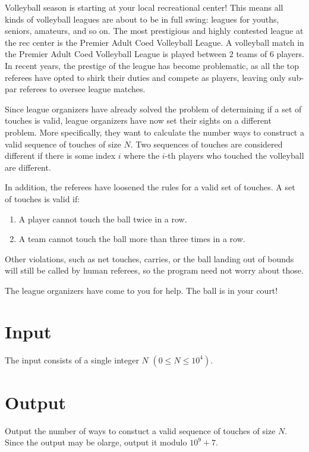 
Volleyball season is starting at your local recreational center! This means all kinds of volleyball
leagues are about to be in full swing: leagues for youths, seniors, amateurs, and so on. The most
prestigious and highly contested league at the rec center is the Premier Adult Coed Volleyball
League. A volleyball match in the Premier Adult Coed Volleyball League is played between $2$ teams of
$6$ players. In recent years, the prestige of the league has become problematic, as all the top referees
have opted to shirk their duties and compete as players, leaving only sub-par referees to oversee
league matches.

Since league organizers have already solved the problem of determining if a set of touches is valid, 
league organizers have now set their sights on a different problem. More specifically, they want to 
calculate the number ways to construct a valid sequence of touches of size $N$. Two sequences of touches 
are considered different if there is some index $i$ where the $i$-th players who touched the 
volleyball are different.

In addition, the referees have loosened the rules for a valid set of touches.
A set of touches is valid if:

\begin{enumerate}
    \item A player cannot touch the ball twice in a row.
    \item A team cannot touch the ball more than three times in a row.
\end{enumerate}

Other violations, such as net touches, carries, or the ball landing out of bounds will still be called
by human referees, so the program need not worry about those.

The league organizers have come to you for help. The ball is in your court!

\section*{Input}

The input consists of a single integer $N$ $(0 \leq N \leq 10^4)$.

\section*{Output}

Output the number of ways to constuct a valid sequence of touches of size $N$. Since the output may be
olarge, output it modulo $10^9 + 7$.
